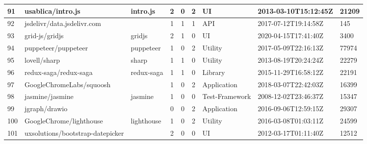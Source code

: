 \begin{landscape}
\begin{table}[]
{\begin{tabular}{lllccclll}
                91  & usablica/intro.js                & intro.js               & 2                      & 0                 & 2                 & UI                & 2013-03-10T15:12:45Z & 21209          \\ \hline
                92  & jsdelivr/data.jsdelivr.com       &                        & 1                      & 1                 & 1                 & API               & 2017-07-12T19:14:58Z & 145            \\ \hline
                93  & grid-js/gridjs                   & gridjs                 & 2                      & 1                 & 0                 & UI                & 2020-04-15T17:41:40Z & 3400           \\ \hline
                94  & puppeteer/puppeteer              & puppeteer              & 1                      & 0                 & 2                 & Utility           & 2017-05-09T22:16:13Z & 77974          \\ \hline
                95  & lovell/sharp                     & sharp                  & 1                      & 1                 & 0                 & Utility           & 2013-08-19T20:24:24Z & 22279          \\ \hline
                96  & redux-saga/redux-saga            & redux-saga             & 1                      & 1                 & 0                 & Library           & 2015-11-29T16:58:12Z & 22191          \\ \hline
                97  & GoogleChromeLabs/squoosh         &                        & 1                      & 0                 & 2                 & Application       & 2018-03-07T22:42:03Z & 16399          \\ \hline
                98  & jasmine/jasmine                  & jasmine                & 1                      & 0                 & 0                 & Test-Framework    & 2008-12-02T23:46:37Z & 15347          \\ \hline
                99  & jgraph/drawio                    &                        & 0                      & 0                 & 2                 & Application       & 2016-09-06T12:59:15Z & 29307          \\ \hline
                100 & GoogleChrome/lighthouse          & lighthouse             & 1                      & 0                 & 2                 & Utility           & 2016-03-08T01:03:11Z & 24599          \\ \hline
                101 & uxsolutions/bootstrap-datepicker &                        & 2                      & 0                 & 0                 & UI                & 2012-03-17T01:11:40Z & 12512          \\ \hline

\end{tabular}}
\end{table}
\end{landscape}
